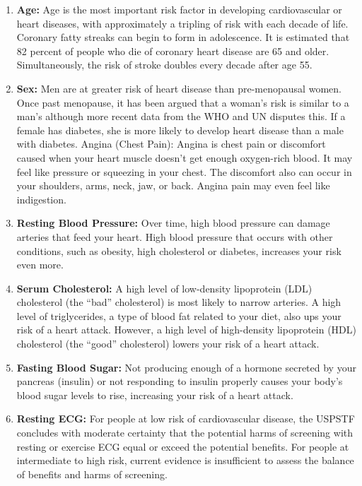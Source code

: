 \documentclass{book}
\begin{document}
	\begin{enumerate}
		\item \textbf{Age:} Age is the most important risk factor in developing cardiovascular or heart diseases, with approximately a tripling of risk with each decade of life. Coronary fatty streaks can begin to form in adolescence. It is estimated that 82 percent of people who die of coronary heart disease are 65 and older. Simultaneously, the risk of stroke doubles every decade after age 55.
		
		\item \textbf{Sex:} Men are at greater risk of heart disease than pre-menopausal women. Once past menopause, it has been argued that a woman’s risk is similar to a man’s although more recent data from the WHO and UN disputes this. If a female has diabetes, she is more likely to develop heart disease than a male with diabetes.
		Angina (Chest Pain): Angina is chest pain or discomfort caused when your heart muscle doesn’t get enough oxygen-rich blood. It may feel like pressure or squeezing in your chest. The discomfort also can occur in your shoulders, arms, neck, jaw, or back. Angina pain may even feel like indigestion.
	
		\item \textbf{Resting Blood Pressure:} Over time, high blood pressure can damage arteries that feed your heart. High blood pressure that occurs with other conditions, such as obesity, high cholesterol or diabetes, increases your risk even more.
		
		\item \textbf{Serum Cholesterol:} A high level of low-density lipoprotein (LDL) cholesterol (the “bad” cholesterol) is most likely to narrow arteries. A high level of triglycerides, a type of blood fat related to your diet, also ups your risk of a heart attack. However, a high level of high-density lipoprotein (HDL) cholesterol (the “good” cholesterol) lowers your risk of a heart attack.
		
		\item \textbf{Fasting Blood Sugar:} Not producing enough of a hormone secreted by your pancreas (insulin) or not responding to insulin properly causes your body’s blood sugar levels to rise, increasing your risk of a heart attack.
		
		\item \textbf{Resting ECG:} For people at low risk of cardiovascular disease, the USPSTF concludes with moderate certainty that the potential harms of screening with resting or exercise ECG equal or exceed the potential benefits. For people at intermediate to high risk, current evidence is insufficient to assess the balance of benefits and harms of screening.
		

\end{enumerate}
\end{document}
